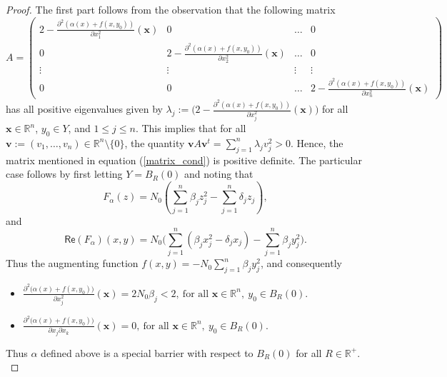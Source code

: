 \documentclass[12pt,reqno, a4paper]{amsart}
\theoremstyle{definition}
\theoremstyle{definition}
\numberwithin{equation}{section}
\def\R{\mathbb{R}}                              %
\begin{document}
\begin{proof}
	The first part follows from the observation that the following matrix
\begin{equation*}
A=
	\begin{pmatrix}
	2-\frac{\partial^2(\alpha(x)+f(x,y_0))}{\partial x_1^2}(\mathbf{x}) & 0  &\ldots& 0\\
	0 & 2-\frac{\partial^2(\alpha(x)+f(x,y_0))}{\partial x_2^2}(\mathbf{x}) &\ldots& 0\\	
\vdots & \vdots &\vdots& \vdots\\
0 & 0 &\ldots& 2-\frac{\partial^2(\alpha(x)+f(x,y_0))}{\partial x_n^2}(\mathbf{x})	
\end{pmatrix}
\end{equation*}
has all positive eigenvalues given by $\lambda_j:=\big(2-\frac{\partial^2(\alpha(x)+f(x,y_0))}{\partial x_j^2}(\mathbf{x})\big)$ for all $\mathbf{x}\in \R^n$, $y_0\in Y$, and $1\leq j\leq n.$ This implies that for all $\textbf{v}:=(v_1,\ldots,v_n)\in \R^n\setminus\{0\}$, the quantity $\textbf{v}A \textbf{v}^t=\sum_{j=1}^n \lambda_j v_j^2>0.$ Hence, the matrix mentioned in equation (\ref{matrix_cond}) is positive definite. The particular case follows by first letting $Y=B_R(0)$ and noting that
	$$F_{\alpha} (z)=N_0(\sum_{j=1}^{n}\beta_jz_j^2-\sum_{j=1}^{n}\delta_jz_j),$$ and $$\textsf{Re}(F_{\alpha})(x,y)=N_0\Big(\sum_{j=1}^{n}(\beta_jx_j^2-\delta_jx_j)-\sum_{j=1}^{n}\beta_jy_j^2\Big).$$
	Thus the augmenting function $f(x,y)=-N_0\sum\limits_{j=1}^{n}\beta_jy_j^2$, and consequently 
	\begin{itemize}
		\item[(a)] $\frac{\partial^2\big(\alpha(x)+f(x,y_0)\big)}{\partial x_j^2}(\mathbf{x})=2N_0\beta_j<2,~\text{for all } \mathbf{x}\in \R^n, ~y_0\in B_R(0).$\\
		\item [(b)] $\frac{\partial^2\big(\alpha(x)+f(x,y_0)\big)}{\partial x_j\partial x_k }(\mathbf{x})=0, ~ \text{for all } \mathbf{x}\in \R^n,~  y_0\in B_R(0).$\\
		
	\end{itemize}
	Thus $\alpha$ defined above is a special barrier with respect to $B_R(0)$ for all $R\in \R^+.$ 
\end{proof}
\end{document}
